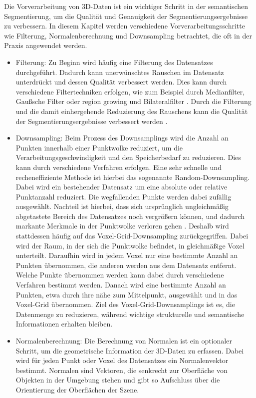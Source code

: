 Die Vorverarbeitung von 3D-Daten ist ein wichtiger Schritt in der semantischen
Segmentierung, um die Qualität und Genauigkeit der Segmentierungsergebnisse zu
verbessern. In diesem Kapitel werden verschiedene Vorverarbeitungsschritte wie
Filterung, Normalenberechnung und Downsampling betrachtet, die oft in der
Praxis angewendet werden.

\begin{itemize}
    \item Filterung: Zu Beginn wird häufig eine Filterung des Datensatzes durchgeführt. Dadurch kann
unerwünschtes Rauschen im Datensatz unterdrückt und dessen Qualität verbessert
werden. Dies kann durch verschiedene Filtertechniken erfolgen, wie zum Beispiel
durch Medianfilter, Gaußsche Filter \cite{9191237} oder region growing und
Bilateralfilter \cite{6460813}. Durch die Filterung und die damit einhergehende
Reduzierung des Rauschens kann die Qualität der Segmentierungsergebnisse
verbessert werden \cite{HAN2017103}.

\item Downsampling: Beim Prozess des Downsamplings wird die Anzahl an Punkten
innerhalb einer Punktwolke reduziert, um die Verarbeitungsgeschwindigkeit und
den Speicherbedarf zu reduzieren. Dies kann durch verschiedene Verfahren
erfolgen. Eine sehr schnelle und recheneffiziente Methode ist hierbei das
sogenannte Random-Downsampling. Dabei wird ein bestehender Datensatz um eine
absolute oder relative Punktanzahl reduziert. Die wegfallenden Punkte werden
dabei zufällig ausgewählt. Nachteil ist hierbei, dass sich ursprünglich
ungleichmäßig abgetastete Bereich des Datensatzes noch vergrößern können, und
dadurch markante Merkmale in der Punktwolke verloren gehen \cite{987567547,2233445566}.
Deshalb wird stattdessen häufig auf das Voxel-Grid-Downsampling
zurückgegriffen. Dabei wird der Raum, in der sich die Punktwolke befindet, in
gleichmäßige Voxel unterteilt. Daraufhin wird in jedem Voxel nur eine bestimmte
Anzahl an Punkten übernommen, die anderen werden aus dem Datensatz entfernt.
Welche Punkte übernommen werden kann dabei durch verschiedene Verfahren
bestimmt werden. Danach wird eine bestimmte Anzahl an Punkten, etwa durch ihre 
nähe zum Mittelpunkt, ausgewählt und in das Voxel-Grid übernommen. Ziel des
Voxel-Grid-Downsamplings ist es, die Datenmenge zu reduzieren, während wichtige
strukturelle und semantische Informationen erhalten bleiben. \cite{6706719}

\item Normalenberechnung: Die Berechnung von Normalen ist ein optionaler Schritt, um
die geometrische Information der 3D-Daten zu erfassen. Dabei wird für jeden
Punkt oder Voxel des Datensatzes ein Normalenvektor bestimmt. Normalen sind
Vektoren, die senkrecht zur Oberfläche von Objekten in der Umgebung stehen und
gibt so Aufschluss über die Orientierung der Oberflächen der Szene. \cite{6375034}

\end{itemize}

